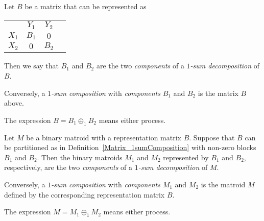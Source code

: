 \begin{definition}
  \label{Matrix_1sumComposition}
  \leanok
  Let $B$ be a matrix that can be represented as
  \begin{tabular}{cccc}
                                 & $Y_{1}$                      & $Y_{2}$                      \\ \cline{2-3}
    \multicolumn{1}{c|}{$X_{1}$} & \multicolumn{1}{c|}{$B_{1}$} & \multicolumn{1}{c|}{    $0$} \\ \cline{2-3}
    \multicolumn{1}{c|}{$X_{2}$} & \multicolumn{1}{c|}{    $0$} & \multicolumn{1}{c|}{$B_{2}$} \\ \cline{2-3}
  \end{tabular}
  Then we say that $B_{1}$ and $B_{2}$ are the two \emph{components} of a \emph{$1$-sum decomposition} of $B$.

  Conversely, a \emph{$1$-sum composition} with \emph{components} $B_{1}$ and $B_{2}$ is the matrix $B$ above.

  The expression $B = B_{1} \oplus_{1} B_{2}$ means either process.
\end{definition}

\begin{definition}
  \label{StandardRepresentation.Is1sumOf}
  \leanok
  Let $M$ be a binary matroid with a representation matrix $B$.
  Suppose that $B$ can be partitioned as in Definition~\ref{Matrix_1sumComposition} with non-zero blocks $B_{1}$ and $B_{2}$.
  Then the binary matroids $M_{1}$ and $M_{2}$ represented by $B_{1}$ and $B_{2}$, respectively, are the two \emph{components} of a \emph{$1$-sum decomposition} of $M$.

  Conversely, a \emph{$1$-sum composition} with \emph{components} $M_{1}$ and $M_{2}$ is the matroid $M$ defined by the corresponding representation matrix $B$.

  The expression $M = M_{1} \oplus_{1} M_{2}$ means either process.
\end{definition}


\begin{lemma}
  \label{StandardRepresentation_1sum_comm}
  \leanok
\end{lemma}

